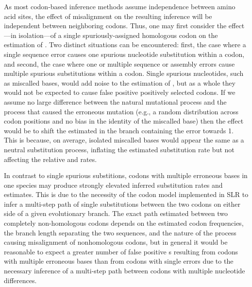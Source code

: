 As most codon-based inference methods assume independence between
amino acid sites, the effect of misalignment on the resulting
inference will be independent between neighboring codons. Thus, one
may first consider the effect---in isolation---of a single
spuriously-assigned homologous codon on the \ml estimation of
\omg. Two distinct situations can be encountered: first, the case
where a single sequence error causes one spurious nucleotide
substitution within a codon, and second, the case where one or
multiple sequence or assembly errors cause multiple spurious
substitutions within a codon. Single spurious nucleotides, such as
miscalled bases, would add noise to the estimation of \omg, but as a
whole they would not be expected to cause false positive positively
selected codons. If we assume no large difference between the natural
mutational process and the process that caused the erroneous mutation
(e.g., a random distribution across codon positions and no bias in the
identity of the miscalled base) then the effect would be to shift the
estimated \omg in the branch containing the error towards 1. This is
because, on average, isolated miscalled bases would appear the same as
a neutral substitution process, inflating the estimated substitution
rate but not affecting the relative \nsyn and \syn rates.

In contrast to single spurious substitions, codons with multiple
erroneous bases in one species may produce strongly elevated inferred
substitution rates and \omg estimates. This is due to the necessity of
the codon model implemented in SLR to infer a multi-step path of
single substitutions between the two codons on either side of a given
evolutionary branch. The exact \ml path estimated between two
completely non-homologous codons depends on the estimated codon
frequencies, the branch length separating the two sequences, and the
nature of the process causing misalignment of nonhomologous codons,
but in general it would be reasonable to expect a greater number of
false positive \pss{}s resulting from codons with multiple erroneous
bases than from codons with single errors due to the necessary
inference of a multi-step path between codons with multiple nucleotide
differences.

